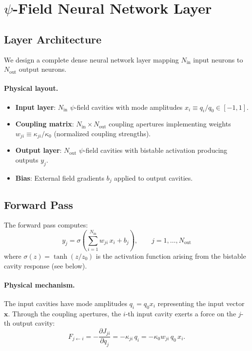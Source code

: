 \documentclass[11pt,twocolumn]{article}
\theoremstyle{definition}
\theoremstyle{remark}
\begin{document}
\section{$\psi$-Field Neural Network Layer}\label{sec:neural}

\subsection{Layer Architecture}\label{sec:layer_arch}

We design a complete dense neural network layer mapping $N_{\mathrm{in}}$
input neurons to $N_{\mathrm{out}}$ output neurons.

\paragraph{Physical layout.}
\begin{itemize}
\item \textbf{Input layer}: $N_{\mathrm{in}}$ $\psi$-field cavities with
mode amplitudes $x_i \equiv q_i/q_0 \in [-1, 1]$.
\item \textbf{Coupling matrix}: $N_{\mathrm{in}} \times
N_{\mathrm{out}}$ coupling apertures implementing weights $w_{ji}
\equiv \kappa_{ji}/\kappa_0$ (normalized coupling strengths).
\item \textbf{Output layer}: $N_{\mathrm{out}}$ $\psi$-field cavities
with bistable activation producing outputs $y_j$.
\item \textbf{Bias}: External field gradients $b_j$ applied to output
cavities.
\end{itemize}

\subsection{Forward Pass}\label{sec:forward}

The forward pass computes:
\begin{equation}
\boxed{
y_j = \sigma\!\left(\sum_{i=1}^{N_{\mathrm{in}}} w_{ji}\,x_i + b_j\right),
\qquad j = 1, \ldots, N_{\mathrm{out}}
}
\label{eq:forward}
\end{equation}
where $\sigma(z) = \tanh(z/z_0)$ is the activation function arising
from the bistable cavity response (see below).

\paragraph{Physical mechanism.}
The input cavities have mode amplitudes $q_i = q_0 x_i$ representing
the input vector $\mathbf{x}$. Through the coupling apertures, the
$i$-th input cavity exerts a force on the $j$-th output cavity:
\begin{equation}
F_{j \leftarrow i} = -\frac{\partial J_{ji}}{\partial q_j}
= -\kappa_{ji}\,q_i = -\kappa_0 w_{ji}\,q_0\,x_i.
\end{equation}
\end{document}
